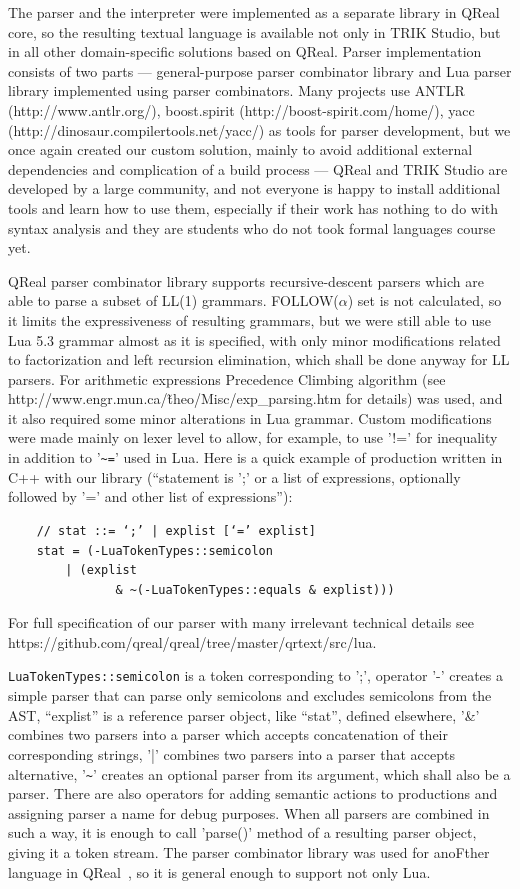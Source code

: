 \documentclass[conference]{IEEEtran}
\begin{document}
The parser and the interpreter were implemented as a separate library in QReal core, so the resulting textual language is available not only in TRIK Studio, but in all other domain-specific solutions based on QReal. Parser implementation consists of two parts --- general-purpose parser combinator library and Lua parser library implemented using parser combinators. Many projects use ANTLR (http://www.antlr.org/), boost.spirit (http://boost-spirit.com/home/), yacc (http://dinosaur.compilertools.net/yacc/) as tools for parser development, but we once again created our custom solution, mainly to avoid additional external dependencies and complication of a build process --- QReal and TRIK Studio are developed by a large community, and not everyone is happy to install additional tools and learn how to use them, especially if their work has nothing to do with syntax analysis and they are students who do not took formal languages course yet.

QReal parser combinator library supports recursive-descent parsers which are able to parse a subset of LL(1) grammars. FOLLOW($\alpha$) set is not calculated, so it limits the expressiveness of resulting grammars, but we were still able to use Lua 5.3 grammar almost as it is specified, with only minor modifications related to factorization and left recursion elimination, which shall be done anyway for LL parsers. For arithmetic expressions Precedence Climbing algorithm (see http://www.engr.mun.ca/\~theo/Misc/exp\_parsing.htm for details) was used, and it also required some minor alterations in Lua grammar. Custom modifications were made mainly on lexer level to allow, for example, to use '!=' for inequality in addition to '\verb|~=|' used in Lua. Here is a quick example of production written in C++ with our library (``statement is ';' or a list of expressions, optionally followed by '=' and other list of expressions''):
\begin{verbatim}
	// stat ::= ‘;’ | explist [‘=’ explist]
	stat = (-LuaTokenTypes::semicolon 
	    | (explist 
			   & ~(-LuaTokenTypes::equals & explist)))
\end{verbatim}

For full specification of our parser with many irrelevant technical details see https://github.com/qreal/qreal/tree/master/qrtext/src/lua. 

\verb|LuaTokenTypes::semicolon| is a token corresponding to ';', operator '-' creates a simple parser that can parse only semicolons and excludes semicolons from the AST, ``explist'' is a reference parser object, like ``stat'', defined elsewhere, '\&' combines two parsers into a parser which accepts concatenation of their corresponding strings, '|' combines two parsers into a parser that accepts alternative, '\verb|~|' creates an optional parser from its argument, which shall also be a parser. There are also operators for adding semantic actions to productions and assigning parser a name for debug purposes. When all parsers are combined in such a way, it is enough to call 'parse()' method of a resulting parser object, giving it a token stream. The parser combinator library was used for anoFther language in QReal~\cite{tikhonova2015generation}, so it is general enough to support not only Lua.
\end{document}
